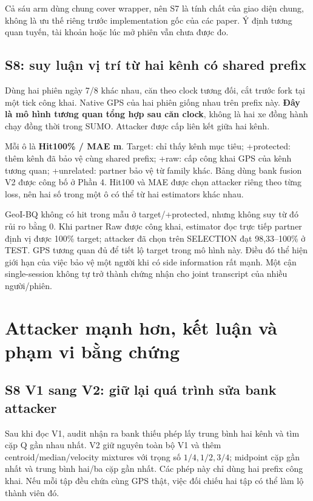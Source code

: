 \documentclass[10pt,a4paper]{article}
\begin{document}
Cả sáu arm dùng chung cover wrapper, nên S7 là tính chất của giao diện chung, không là ưu thế riêng trước
implementation gốc của các paper. Ý định tương quan tuyến, tài khoản hoặc lúc mở phiên vẫn chưa được đo.

\subsection{S8: suy luận vị trí từ hai kênh có shared prefix}
Dùng hai phiên ngày 7/8 khác nhau, căn theo clock tương đối, cắt trước fork tại một tick công khai.
Native GPS của hai phiên giống nhau trên prefix này. \textbf{Đây là mô hình tương quan tổng hợp sau căn clock},
không là hai xe đồng hành chạy đồng thời trong SUMO. Attacker được cấp liên kết giữa hai kênh.

Mỗi ô là \textbf{Hit100\% / MAE m}. Target: chỉ thấy kênh mục tiêu; +protected: thêm kênh đã bảo vệ cùng
shared prefix; +raw: cấp công khai GPS của kênh tương quan; +unrelated: partner bảo vệ từ family khác.
Bảng dùng bank fusion V2 được công bố ở Phần 4.
Hit100 và MAE được chọn attacker riêng theo từng loss, nên hai số trong một ô có thể từ hai estimators khác nhau.
\begin{small}\end{small}

GeoI-BQ không có hit trong mẫu ở target/+protected, nhưng không suy từ đó rủi ro bằng 0.
Khi partner Raw được công khai, estimator đọc trực tiếp partner định vị được 100\% target; attacker đã chọn
trên SELECTION đạt 98,33--100\% ở TEST. GPS tương quan đủ để tiết lộ target trong mô hình này.
Điều đó thể hiện giới hạn của việc bảo vệ một người khi có side information rất mạnh.
Một cận single-session không tự trở thành chứng nhận cho joint transcript của nhiều người/phiên.

\clearpage
\section{Attacker mạnh hơn, kết luận và phạm vi bằng chứng}
\subsection{S8 V1 sang V2: giữ lại quá trình sửa bank attacker}
Sau khi đọc V1, audit nhận ra bank thiếu phép lấy trung bình hai kênh và tìm cặp Q gần nhau nhất.
V2 giữ nguyên toàn bộ V1 và thêm centroid/median/velocity mixtures với trọng số $1/4,1/2,3/4$;
midpoint cặp gần nhất và trung bình hai/ba cặp gần nhất. Các phép này chỉ dùng hai prefix công khai.
Nếu mỗi tập đều chứa cùng GPS thật, việc đối chiếu hai tập có thể làm lộ thành viên đó.
\end{document}
